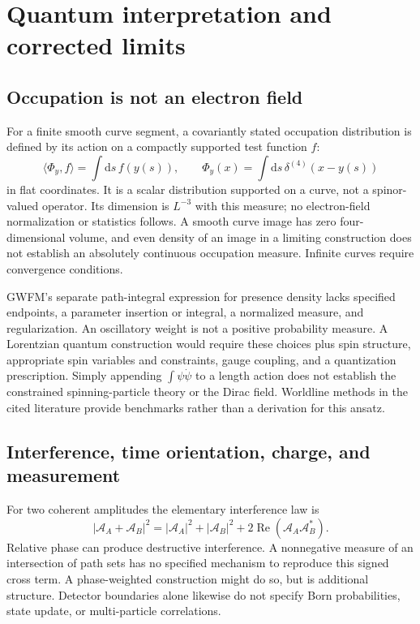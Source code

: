 \documentclass[aip,jmp,reprint,onecolumn,amsmath,amssymb]{revtex4-2}
\newcommand{\dd}{\mathrm{d}}
\begin{document}
\section{Quantum interpretation and corrected limits}
\subsection{Occupation is not an electron field}
For a finite smooth curve segment, a covariantly stated occupation distribution is defined by its action on a compactly supported test function $f$:
\begin{equation}
 \langle\Phi_y,f\rangle=\int\dd s\,f(y(s)),\qquad
 \Phi_y(x)=\int\dd s\,\delta^{(4)}(x-y(s))
 \label{eq:occupation}
\end{equation}
in flat coordinates. It is a scalar distribution supported on a curve, not a spinor-valued operator. Its dimension is $L^{-3}$ with this measure; no electron-field normalization or statistics follows. A smooth curve image has zero four-dimensional volume, and even density of an image in a limiting construction does not establish an absolutely continuous occupation measure. Infinite curves require convergence conditions.

GWFM's separate path-integral expression for presence density lacks specified endpoints, a parameter insertion or integral, a normalized measure, and regularization. An oscillatory weight is not a positive probability measure. A Lorentzian quantum construction would require these choices plus spin structure, appropriate spin variables and constraints, gauge coupling, and a quantization prescription. Simply appending $\int\psi\dot\psi$ to a length action does not establish the constrained spinning-particle theory or the Dirac field. Worldline methods in the cited literature provide benchmarks rather than a derivation for this ansatz.\cite{strassler,schubert}

\subsection{Interference, time orientation, charge, and measurement}
For two coherent amplitudes the elementary interference law is
\begin{equation}
 |\mathcal A_A+\mathcal A_B|^2
 =|\mathcal A_A|^2+|\mathcal A_B|^2
 +2\operatorname{Re}(\mathcal A_A\mathcal A_B^*).
\end{equation}
Relative phase can produce destructive interference. A nonnegative measure of an intersection of path sets has no specified mechanism to reproduce this signed cross term. A phase-weighted construction might do so, but is additional structure. Detector boundaries alone likewise do not specify Born probabilities, state update, or multi-particle correlations.
\end{document}
